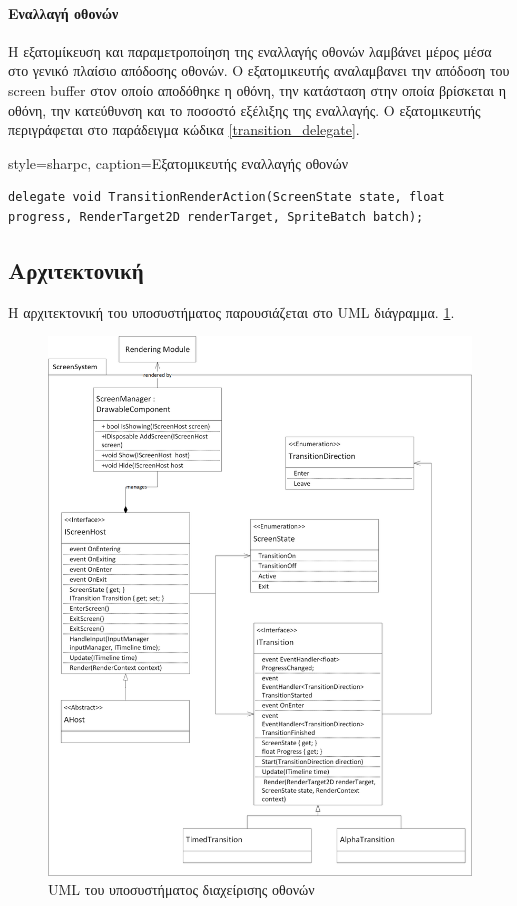 	\paragraph{Εναλλαγή οθονών}
	Η εξατομίκευση και παραμετροποίηση της εναλλαγής οθονών λαμβάνει μέρος μέσα στο γενικό πλαίσιο απόδοσης οθονών. Ο εξατομικευτής αναλαμβανει την απόδοση του screen buffer στον οποίο αποδόθηκε η οθόνη, την κατάσταση στην οποία βρίσκεται η οθόνη, την κατεύθυνση και το ποσοστό εξέλιξης της εναλλαγής. Ο εξατομικευτής περιγράφεται στο παράδειγμα κώδικα \ref{transition_delegate}.
			
	\lstset
	{
		style=sharpc, 
		caption={Εξατομικευτής εναλλαγής οθονών}
	}
	\begin{lstlisting}[label={transition_delegate}]	
delegate void TransitionRenderAction(ScreenState state, float progress, RenderTarget2D renderTarget, SpriteBatch batch);
	\end{lstlisting}
	
	\newpage
	\subsection{Αρχιτεκτονική}
Η αρχιτεκτονική του υποσυστήματος παρουσιάζεται στο \gls{UML} διάγραμμα. \ref{fig:core_screensystem}.
	\begin{figure}[h!]	
		\centering
		\includegraphics[width=160mm]{Images/core_screensystem}
		\caption{UML του υποσυστήματος διαχείρισης οθονών}
		\label{fig:core_screensystem}
	\end{figure}		
	
